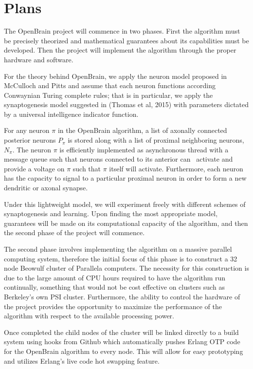 \documentclass[letter]{article}
\begin{document}
\section{Plans}
The OpenBrain project will commence in two phases. First the algorithm must be precisely theorized and mathematical
guarantees about its capabilities must be developed. Then the project will implement the algorithm through the proper hardware and software.

For the theory behind OpenBrain, we apply the neuron model proposed in McCulloch and Pitts \cite{mcpitts} and assume that each neuron
functions according Conwaynian Turing complete rules; that is in particular, we apply the synaptogenesis model suggested in
(Thomas et al, 2015) with parameters dictated by a universal intelligence indicator function.

For any neuron $\pi$ in the OpenBrain algorithm, a list of axonally connected posterior neurons $P_\pi$ is stored along with
a list of proximal neighboring neurons, $N_\pi.$ The neuron $\pi$ is efficiently implemented as asynchronous thread with a message
queue such that neurons connected to its anterior can \ activate and provide a voltage on $\pi$ such that $\pi$ itself
will activate. Furthermore, each neuron has the capacity to signal to a particular proximal neuron in order to form a new dendritic or axonal
synapse.

Under this lightweight model, we will experiment freely with different schemes of synaptogenesis and learning. Upon finding the most
appropriate model, guarantees will be made on its computational capacity of the algorithm, and then the second
phase of the project will commence.

The second phase involves implementing the algorithm on a massive parallel computing system, therefore the initial
focus of this phase is to construct a 32 node Beowulf cluster of Parallela computers. The necessity for this construction
is due to the large amount of CPU hours required to have the algorithm run continually, something that would not be cost effective
on clusters such as Berkeley's own PSI cluster. Furthermore, the ability to control the hardware of the project provides the opportunity
to maximize the performance of the algorithm with respect to the available processing power.

Once completed the child nodes of the cluster will be linked directly to a build system using hooks from Github which automatically pushes Erlang
OTP code for the OpenBrain algorithm to every node. This will allow for easy prototyping and utilizes Erlang's live code hot swapping feature.
\end{document}
